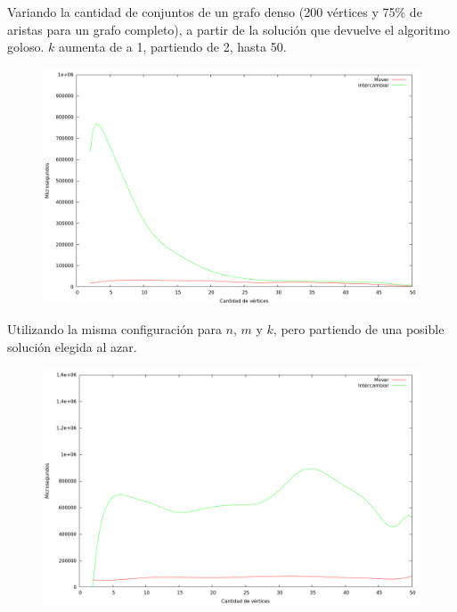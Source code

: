 \vspace*{0.35cm}

Variando la cantidad de conjuntos de un grafo denso (200 vértices y 75\% de
aristas para un grafo completo), a partir de la solución que devuelve el
algoritmo goloso. $k$ aumenta de a 1, partiendo de 2, hasta 50.

\vspace*{0.5cm}

\begin{figure}[H]
  \begin{center}
    \includegraphics[scale=0.35]{imagenes/local-goloso-k-tiempo.png}
  \end{center}
\end{figure}

\vspace*{0.5cm}


Utilizando la misma configuración para $n$, $m$ y $k$, pero partiendo de una
posible solución elegida al azar.

\vspace*{0.5cm}

\begin{figure}[H]
  \begin{center}
    \includegraphics[scale=0.35]{imagenes/local-random-k-tiempo.png}
  \end{center}
\end{figure}

